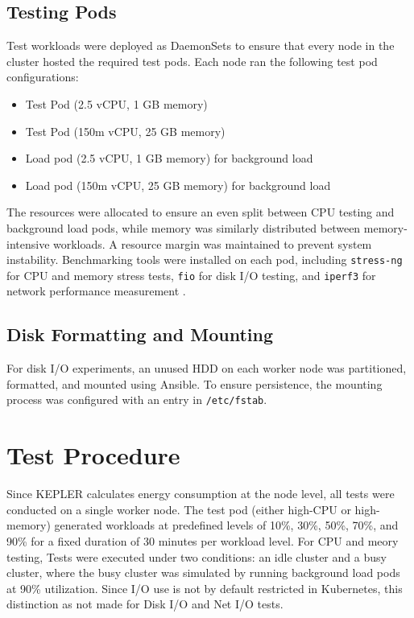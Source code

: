 \subsection{Testing Pods}
Test workloads were deployed as DaemonSets to ensure that every node in the cluster hosted the required test pods. Each node ran the following test pod configurations:
\begin{itemize}
\item Test Pod (2.5 vCPU, 1 GB memory)
\item Test Pod (150m vCPU, 25 GB memory)
\item Load pod (2.5 vCPU, 1 GB memory) for background load
\item Load pod (150m vCPU, 25 GB memory) for background load
\end{itemize}
The resources were allocated to ensure an even split between CPU testing and background load pods, while memory was similarly distributed between memory-intensive workloads. A resource margin was maintained to prevent system instability. Benchmarking tools were installed on each pod, including \texttt{stress-ng}\parencite{stress-ng} for CPU and memory stress tests, \texttt{fio}\parencite{fio} for disk I/O testing, and \texttt{iperf3}\parencite{iperf3} for network performance measurement .

\subsection{Disk Formatting and Mounting}
For disk I/O experiments, an unused HDD on each worker node was partitioned, formatted, and mounted using Ansible. To ensure persistence, the mounting process was configured with an entry in \texttt{/etc/fstab}.

\section{Test Procedure}
Since KEPLER calculates energy consumption at the node level, all tests were conducted on a single worker node. The test pod (either high-CPU or high-memory) generated workloads at predefined levels of 10\%, 30\%, 50\%, 70\%, and 90\% for a fixed duration of 30 minutes per workload level. For CPU and meory testing, Tests were executed under two conditions: an idle cluster and a busy cluster, where the busy cluster was simulated by running background load pods at 90\% utilization. Since I/O use is not by default restricted in Kubernetes, this distinction as not made for Disk I/O and Net I/O tests.


